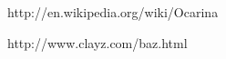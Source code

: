 \documentclass[journal]{IEEEtran}
\begin{document}


\ifCLASSOPTIONcaptionsoff
  \newpage
\fi





%
%
%
\begin{thebibliography}{2}

http://en.wikipedia.org/wiki/Ocarina

http://www.clayz.com/baz.html

\end{thebibliography}

% 

\end{document}
